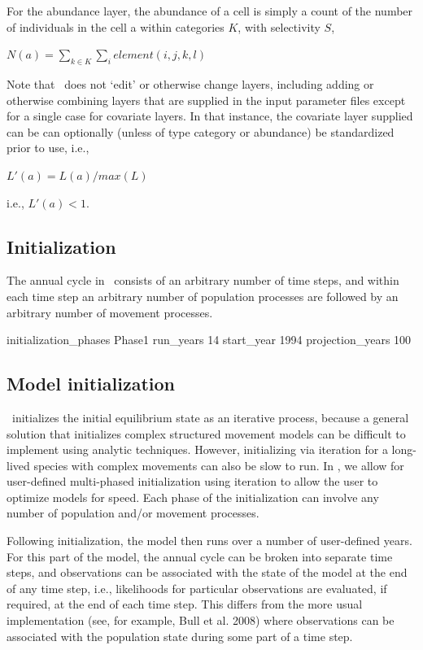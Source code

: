 For the abundance layer, the abundance of a cell is simply a count of the number of individuals in the cell a within categories $K$, with selectivity $S$,

$N(a)=\sum_{k\in K} \sum_i element(i,j,k,l)$

Note that \SPM\ does not `edit' or otherwise change layers, including adding or otherwise combining layers that are supplied in the input parameter files \textemdash except for a single case for covariate layers. In that instance, the covariate layer supplied can be can optionally (unless of type category or abundance) be standardized prior to use, i.e.,

$L'(a)=L(a)/max(L)$

i.e., $L'(a) < 1$.

\subsection{Initialization}

The annual cycle in \SPM\ consists of an arbitrary number of time steps, and within each time step an arbitrary number of population processes are followed by an arbitrary number of movement processes. 

initialization\_phases Phase1
run\_years 14
start\_year 1994
projection\_years 100

\subsection{Model initialization}

\SPM\ initializes the initial equilibrium state as an iterative process, because a general solution that initializes complex structured movement models can be difficult to implement using analytic techniques. However, initializing via iteration for a long-lived species with complex movements can also be slow to run. In \SPM, we allow for user-defined multi-phased initialization using iteration to allow the user to optimize models for speed. Each phase of the initialization can involve any number of population and/or movement processes. 

Following initialization, the model then runs over a number of user-defined years. For this part of the model, the annual cycle can be broken into separate time steps, and observations can be associated with the state of the model at the end of any time step, i.e., likelihoods for particular observations are evaluated, if required, at the end of each time step. This differs from the more usual implementation (see, for example, Bull et al. 2008) where observations can be associated with the population state during some part of a time step. 

